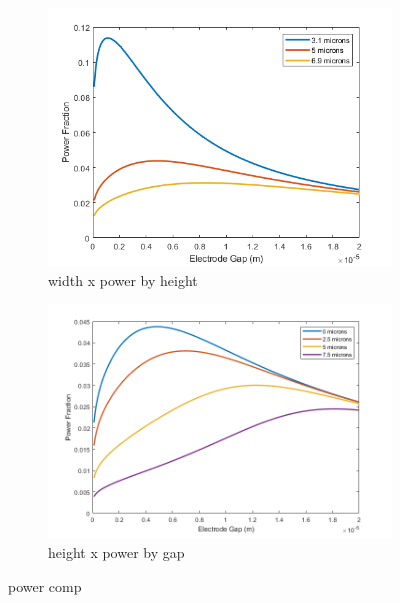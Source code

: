 \begin{figure}[h]
\begin{subfigure}[b]{0.49\textwidth}
        \centering
        \includegraphics[width=\textwidth]{images/analytic_vertical_power_width20.png}
        \caption{width x power by height}
    \end{subfigure}
    \hfill
    \begin{subfigure}[b]{0.49\textwidth}
        \centering
        \includegraphics[width=\textwidth]{images/analytic_horizontal_power_20width.png}
        \caption{height x power by gap}
    \end{subfigure}
    \caption[power comp]{power comp}
    \label{fig:analytic_sensitivity}
\end{figure}

